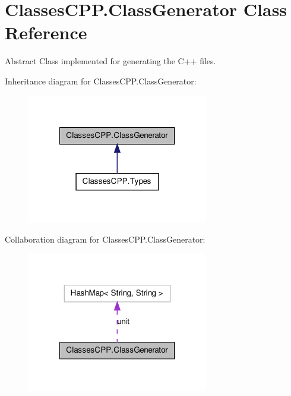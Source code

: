\hypertarget{class_classes_c_p_p_1_1_class_generator}{
\section{ClassesCPP.ClassGenerator Class Reference}
\label{class_classes_c_p_p_1_1_class_generator}
}


Abstract Class implemented for generating the C++ files.  




Inheritance diagram for ClassesCPP.ClassGenerator:\nopagebreak
\begin{figure}[H]
\begin{center}
\leavevmode
\includegraphics[width=224pt]{class_classes_c_p_p_1_1_class_generator__inherit__graph}
\end{center}
\end{figure}


Collaboration diagram for ClassesCPP.ClassGenerator:\nopagebreak
\begin{figure}[H]
\begin{center}
\leavevmode
\includegraphics[width=224pt]{class_classes_c_p_p_1_1_class_generator__coll__graph}
\end{center}
\end{figure}
